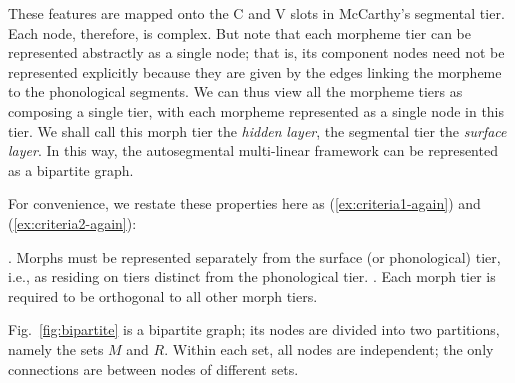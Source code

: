 
These features are mapped onto the
C and V slots in McCarthy's segmental tier. 
 Each node, therefore, is complex.
But note that each morpheme tier can be represented abstractly as a single node; that is, 
its component nodes need not be represented explicitly 
because they are given by the edges linking the morpheme to the phonological segments.
We can thus view all the morpheme tiers as composing a single tier, with each morpheme represented as a single node in this tier.
We shall call this morph tier the \emph{hidden} \emph{layer}, the segmental tier the \emph{surface} \emph{layer}. 
In this way, the autosegmental multi-linear framework can be represented as a bipartite graph.

For convenience, we restate these properties here as (\ref{ex:criteria1-again}) and (\ref{ex:criteria2-again}):
\begin{exe} \label{ex:criteria-again} \ex \begin{xlist}
	.  %
	Morphs must be represented separately 
	from the surface (or phonological) tier, i.e., as residing on tiers distinct from 
	the phonological tier. \label{ex:criteria1-again}%
	.
	Each morph tier is required to be orthogonal to all other morph tiers. \label{ex:criteria2-again}
	\end{xlist}
\end{exe}
Fig.~\ref{fig:bipartite} is a bipartite
graph; its nodes are divided into two partitions, namely the sets $M$
and $R$. Within each set, all nodes are independent; 
the only connections are between nodes of different sets.

